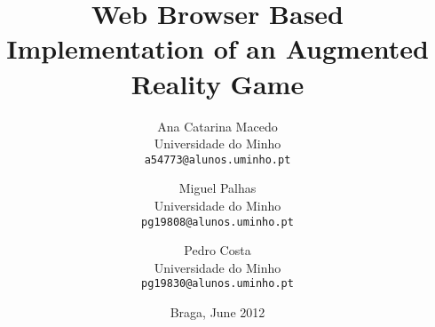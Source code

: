 \documentclass[10pt,a4paper,twocolumn]{article}
\title{Web Browser Based Implementation of an Augmented Reality Game}
\author{Ana Catarina Macedo \\
Universidade do Minho \\
\texttt{\small a54773@alunos.uminho.pt}
\and
Miguel Palhas \\
Universidade do Minho \\
\texttt{\small pg19808@alunos.uminho.pt}
\and
Pedro Costa \\
Universidade do Minho \\
\texttt{\small pg19830@alunos.uminho.pt}
}
\date{Braga, June 2012}
\begin{document}
\maketitle






\nocite{jsartoolkit}
\nocite{heikkinen2012}
\nocite{bulbapedia}



\appendix


%
\end{document}
